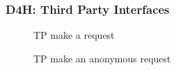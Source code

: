 {\color{Blue}\subsubsection{D4H: Third Party Interfaces}}
\begin{figure}[H]
	\centering
	\centering\setlength{\captionmargin}{0pt}%
	\caption{TP make a request}
	\label{figura5}
\end{figure}

\begin{figure}[H]
	\centering\setlength{\captionmargin}{0pt}%
	\caption{TP make an anonymous request}
	\label{figura6}
\end{figure}

